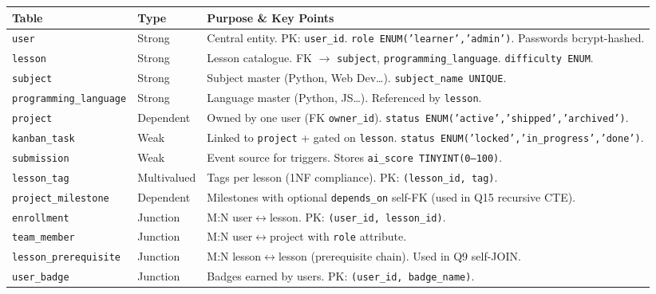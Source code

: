 \documentclass[11pt,a4paper]{article}
\newcommand{\T}[1]{\texttt{#1}}          %
\begin{document}
\begin{center}
\renewcommand{\arraystretch}{1.25}
\begin{tabular}{@{}p{3.5cm}p{2cm}p{7cm}@{}}
\toprule
\rowcolor{tableheadbg}
{\color{white}\textbf{Table}} &
{\color{white}\textbf{Type}} &
{\color{white}\textbf{Purpose \& Key Points}} \\
\midrule
\rowcolor{tablerowbg}
\T{user}              & Strong     & Central entity. PK: \T{user\_id}. \T{role ENUM('learner','admin')}. Passwords bcrypt-hashed. \\
\T{lesson}            & Strong     & Lesson catalogue. FK $\to$ \T{subject}, \T{programming\_language}. \T{difficulty ENUM}. \\
\rowcolor{tablerowbg}
\T{subject}           & Strong     & Subject master (Python, Web Dev\ldots{}). \T{subject\_name UNIQUE}. \\
\T{programming\_language} & Strong & Language master (Python, JS\ldots{}). Referenced by \T{lesson}. \\
\rowcolor{tablerowbg}
\T{project}           & Dependent  & Owned by one user (FK \T{owner\_id}). \T{status ENUM('active','shipped','archived')}. \\
\T{kanban\_task}      & Weak       & Linked to \T{project} + gated on \T{lesson}. \T{status ENUM('locked','in\_progress','done')}. \\
\rowcolor{tablerowbg}
\T{submission}        & Weak       & Event source for triggers. Stores \T{ai\_score TINYINT(0--100)}. \\
\T{lesson\_tag}       & Multivalued & Tags per lesson (1NF compliance). PK: \T{(lesson\_id, tag)}. \\
\rowcolor{tablerowbg}
\T{project\_milestone} & Dependent & Milestones with optional \T{depends\_on} self-FK (used in Q15 recursive CTE). \\
\T{enrollment}        & Junction   & M:N user$\leftrightarrow$lesson. PK: \T{(user\_id, lesson\_id)}. \\
\rowcolor{tablerowbg}
\T{team\_member}      & Junction   & M:N user$\leftrightarrow$project with \T{role} attribute. \\
\T{lesson\_prerequisite} & Junction & M:N lesson$\leftrightarrow$lesson (prerequisite chain). Used in Q9 self-JOIN. \\
\rowcolor{tablerowbg}
\T{user\_badge}       & Junction   & Badges earned by users. PK: \T{(user\_id, badge\_name)}. \\
\bottomrule
\end{tabular}
\end{center}
\end{document}
